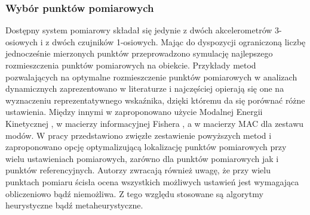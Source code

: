 \subsubsection{Wybór punktów pomiarowych} \label{sect:choose_measuremanet_locations}
Dostępny system pomiarowy składał się jedynie z dwóch akcelerometrów 3-osiowych i z dwóch czujników 1-osiowych.  Mając do dyspozycji ograniczoną liczbę jednocześnie mierzonych punktów przeprowadzono symulację najlepszego rozmieszczenia punktów pomiarowych na obiekcie. Przykłady metod pozwalających na optymalne rozmieszczenie punktów pomiarowych w analizach dynamicznych zaprezentowano w literaturze i najczęściej opierają się one na wyznaczeniu reprezentatywnego wskaźnika, dzięki któremu da się porównać różne ustawienia. Między innymi w \cite{Kammer1991,Papadopoulos1998} zaproponowano użycie Modalnej Energii Kinetycznej , w \cite{Udwadia1994} macierzy informacyjnej Fishera , a w \cite{Penny1994,Allemang2003} macierzy MAC dla zestawu modów. W pracy \cite{Zhang2017} przedstawiono zwięzłe zestawienie powyższych metod i zaproponowano opcję optymalizującą lokalizację punktów pomiarowych przy wielu ustawieniach pomiarowych, zarówno dla punktów pomiarowych jak i punktów referencyjnych. Autorzy zwracają również uwagę, że przy wielu punktach pomiaru ścisła ocena wszystkich możliwych ustawień jest wymagająca obliczeniowo bądź niemożliwa. Z tego względu stosowane są algorytmy heurystyczne bądź metaheurystyczne. 

